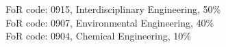 FoR code: 0915, Interdisciplinary Engineering, 50\% \\
FoR code: 0907, Environmental Engineering, 40\% \\
FoR code: 0904, Chemical Engineering, 10\%
\clearpage




\pagestyle{headings}

\tableofcontents
	\clearpage
\listoffigures
	\clearpage
\listoftables



